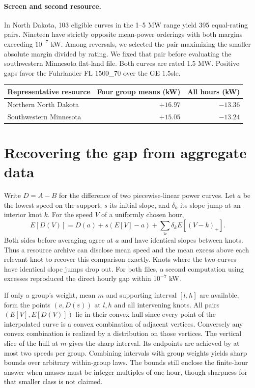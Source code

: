 \documentclass[11pt]{article}
\begin{document}
\paragraph{Screen and second resource.} In North Dakota, 103 eligible curves in the 1--5 MW range yield 395 equal-rating pairs. Nineteen have strictly opposite mean-power orderings with both margins exceeding $10^{-7}$ kW. Among reversals, we selected the pair maximizing the smaller absolute margin divided by rating. We fixed that pair before evaluating the southwestern Minnesota flat-land file. Both curves are rated 1.5 MW. Positive gaps favor the Fuhrlander FL 1500\_70 over the GE 1.5sle.
\begin{center}\begin{tabular}{lrr}\toprule
Representative resource & Four group means (kW) & All hours (kW)\\\midrule
Northern North Dakota & $+16.97$ & $-13.36$\\
Southwestern Minnesota & $+15.05$ & $-13.24$\\\bottomrule
\end{tabular}\end{center}
\newpage
\section*{Recovering the gap from aggregate data}
Write $D=A-B$ for the difference of two piecewise-linear power curves. Let $a$ be the lowest speed on the support, $s$ its initial slope, and $\delta_k$ its slope jump at an interior knot $k$. For the speed $V$ of a uniformly chosen hour,
\[
 E[D(V)] = D(a)+s(E[V]-a)+\sum_k\delta_k E[(V-k)_+].
\]
Both sides before averaging agree at $a$ and have identical slopes between knots. Thus a resource archive can disclose mean speed and the mean excess above each relevant knot to recover this comparison exactly. Knots where the two curves have identical slope jumps drop out. For both files, a second computation using excesses reproduced the direct hourly gap within $10^{-7}$ kW.

If only a group's weight, mean $m$ and supporting interval $[l,h]$ are available, form the points $(v,D(v))$ at $l,h$ and all intervening knots. All pairs $(E[V],E[D(V)])$ lie in their convex hull since every point of the interpolated curve is a convex combination of adjacent vertices. Conversely any convex combination is realized by a distribution on those vertices. The vertical slice of the hull at $m$ gives the sharp interval. Its endpoints are achieved by at most two speeds per group. Combining intervals with group weights yields sharp bounds over arbitrary within-group laws. The bounds still enclose the finite-hour answer when masses must be integer multiples of one hour, though sharpness for that smaller class is not claimed.
\end{document}

